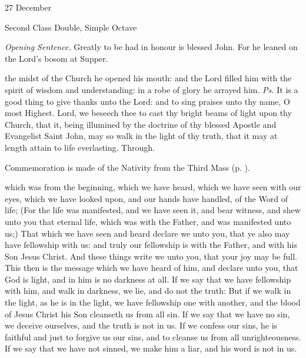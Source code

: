 \begin{inhead}
{27 December}\par
{Second Class Double, Simple Octave}
\end{inhead}
\par\noindent
\textit{Opening Sentence.} Greatly to be had in honour is blessed John. For he leaned on the Lord's bosom at Supper.


\introit
{} the midst of the Church he opened his mouth: and the Lord filled him with the spirit of wisdom and understanding: in a robe of glory he arrayed him. \textit{Ps.} It is a good thing to give thanks unto the Lord: and to sing praises unto thy name, O most Highest.
\collect
{} Lord, we beseech thee to cast thy bright beams of light upon thy Church, that it, being illumined by the doctrine of thy blessed Apostle and Evangelist Saint John, may so walk in the light of thy truth, that it may at length attain to life everlasting. Through.
\begin{rubric}
    Commemoration is made of the Nativity from the Third Mass (p. \pageref{NativityMassIII}).
\end{rubric}
 which was from the beginning, which we have heard, which we have seen with our eyes, which we have looked upon, and our hands have handled, of the Word of life; (For the life was manifested, and we have seen it, and bear witness, and shew unto you that eternal life, which was with the Father, and was manifested unto us;) That which we have seen and heard declare we unto you, that ye also may have fellowship with us: and truly our fellowship is with the Father, and with his Son Jesus Christ. And these things write we unto you, that your joy may be full. This then is the message which we have heard of him, and declare unto you, that God is light, and in him is no darkness at all. If we say that we have fellowship with him, and walk in darkness, we lie, and do not the truth: But if we walk in the light, as he is in the light, we have fellowship one with another, and the blood of Jesus Christ his Son cleanseth us from all sin. If we say that we have no sin, we deceive ourselves, and the truth is not in us. If we confess our sins, he is faithful and just to forgive us our sins, and to cleanse us from all unrighteousness. If we say that we have not sinned, we make him a liar, and his word is not in us.

